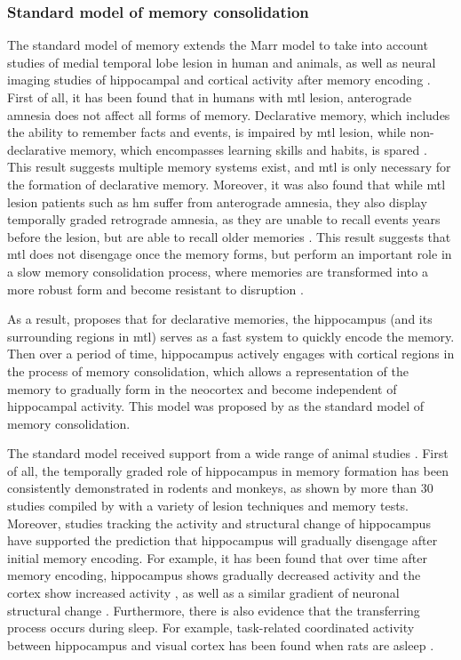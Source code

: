 \subsubsection{Standard model of memory consolidation \label{hpc-squire}}
The standard model of memory extends the Marr model to take into account studies of medial temporal lobe lesion in human and animals, as well as neural imaging studies of hippocampal and cortical activity after memory encoding \citep{squire92, squire09}. First of all, it has been found that in humans with \gls{mtl} lesion, anterograde amnesia does not affect all forms of memory. Declarative memory, which includes the ability to remember facts and events, is impaired by \gls{mtl} lesion, while non-declarative memory, which encompasses learning skills and habits, is spared \citep{cohen80, squire04}. This result suggests multiple memory systems exist, and \gls{mtl} is only necessary for the formation of declarative memory. Moreover, it was also found that while \gls{mtl} lesion patients such as \gls{hm} suffer from anterograde amnesia, they also display temporally graded retrograde amnesia, as they are unable to recall events years before the lesion, but are able to recall older memories \citep{marslen-wilson75}. This result suggests that \gls{mtl} does not disengage once the memory forms, but perform an important role in a slow memory consolidation process, where memories are transformed into a more robust form and become resistant to disruption \citep{squire92}. 

As a result, \citet{squire92} proposes that for declarative memories, the hippocampus (and its surrounding regions in \gls{mtl}) serves as a fast system to quickly encode the memory. Then over a period of time, hippocampus actively engages with cortical regions in the process of memory consolidation, which allows a representation of the memory to gradually form in the neocortex and become independent of hippocampal activity. This model was proposed by \citet{squire92} as the standard model of memory consolidation. 

The standard model received support from a wide range of animal studies \citep{squire09}. First of all, the temporally graded role of hippocampus in memory formation has been consistently demonstrated in rodents and monkeys, as shown by more than 30 studies compiled by \citet{frankland05} with a variety of lesion techniques and memory tests. Moreover, studies tracking the activity and structural change of hippocampus have supported the prediction that hippocampus will gradually disengage after initial memory encoding. For example, it has been found that over time after memory encoding, hippocampus shows gradually decreased activity and the cortex show increased activity \citep[e.g.,][]{bontempi99, frankland04a, takehara-nishiuchi06}, as well as a similar gradient of neuronal structural change \citep[e.g.][]{routtenberg00, maviel04, restivo09}. Furthermore, there is also evidence that the transferring process occurs during sleep. For example, task-related coordinated activity between hippocampus and visual cortex has been found when rats are asleep \citep{ji07}. 

